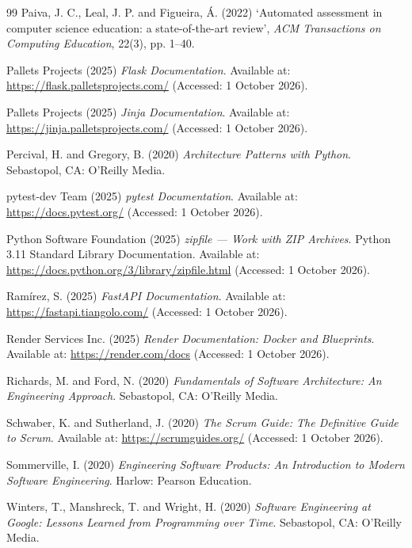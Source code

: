 \documentclass[a4paper,11pt]{article}
\begin{document}
\begin{thebibliography}{99}
Paiva, J. C., Leal, J. P. and Figueira, \'{A}. (2022) `Automated assessment in
computer science education: a state-of-the-art review', \textit{ACM
Transactions on Computing Education}, 22(3), pp. 1--40.

Pallets Projects (2025) \textit{Flask Documentation}. Available at:
\url{https://flask.palletsprojects.com/} (Accessed: 1 October 2026).

Pallets Projects (2025) \textit{Jinja Documentation}. Available at:
\url{https://jinja.palletsprojects.com/} (Accessed: 1 October 2026).

Percival, H. and Gregory, B. (2020) \textit{Architecture Patterns with Python}.
Sebastopol, CA: O'Reilly Media.

pytest-dev Team (2025) \textit{pytest Documentation}. Available at:
\url{https://docs.pytest.org/} (Accessed: 1 October 2026).

Python Software Foundation (2025) \textit{zipfile --- Work with ZIP Archives}.
Python 3.11 Standard Library Documentation. Available at:
\url{https://docs.python.org/3/library/zipfile.html} (Accessed: 1 October 2026).

Ram\'{i}rez, S. (2025) \textit{FastAPI Documentation}. Available at:
\url{https://fastapi.tiangolo.com/} (Accessed: 1 October 2026).

Render Services Inc. (2025) \textit{Render Documentation: Docker and Blueprints}.
Available at: \url{https://render.com/docs} (Accessed: 1 October 2026).

Richards, M. and Ford, N. (2020) \textit{Fundamentals of Software Architecture:
An Engineering Approach}. Sebastopol, CA: O'Reilly Media.

Schwaber, K. and Sutherland, J. (2020) \textit{The Scrum Guide: The Definitive
Guide to Scrum}. Available at: \url{https://scrumguides.org/} (Accessed: 1 October 2026).

Sommerville, I. (2020) \textit{Engineering Software Products: An Introduction
to Modern Software Engineering}. Harlow: Pearson Education.

Winters, T., Manshreck, T. and Wright, H. (2020) \textit{Software Engineering
at Google: Lessons Learned from Programming over Time}. Sebastopol, CA: O'Reilly Media.

\end{thebibliography}
\end{document}
